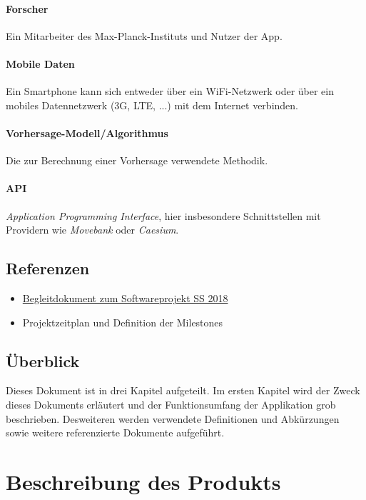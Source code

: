 \documentclass[12pt]{article} %
\begin{document}
 \paragraph{Forscher} Ein Mitarbeiter des Max-Planck-Instituts und Nutzer der App.
 \paragraph{Mobile Daten} Ein Smartphone kann sich entweder über ein WiFi-Netzwerk oder über ein mobiles Datennetzwerk (3G, LTE, ...) mit dem Internet verbinden. 
\paragraph{Vorhersage-Modell/Algorithmus} Die zur Berechnung einer Vorhersage verwendete Methodik. 
\paragraph{API} \textit{Application Programming Interface}, hier insbesondere Schnittstellen mit Providern wie \textit{Movebank} oder \textit{Caesium}. 

\subsection{Referenzen}

\begin{itemize} 
 	 \item  \href{https://docs.google.com/document/d/1Yc2f18JFaHyhrgM2h2WiATQ0zVmZnsc9W1ImhwWJF-g/edit?usp=sharing}{Begleitdokument zum Softwareprojekt SS 2018}
 	 \item Projektzeitplan und Definition der Milestones
\end{itemize} 



\subsection{Überblick}

Dieses Dokument ist in drei Kapitel aufgeteilt. Im ersten Kapitel wird der Zweck dieses Dokuments erläutert und der Funktionsumfang der Applikation grob beschrieben. Desweiteren werden verwendete Definitionen und Abkürzungen sowie weitere referenzierte Dokumente aufgeführt.


\section{Beschreibung des Produkts}
\end{document}
